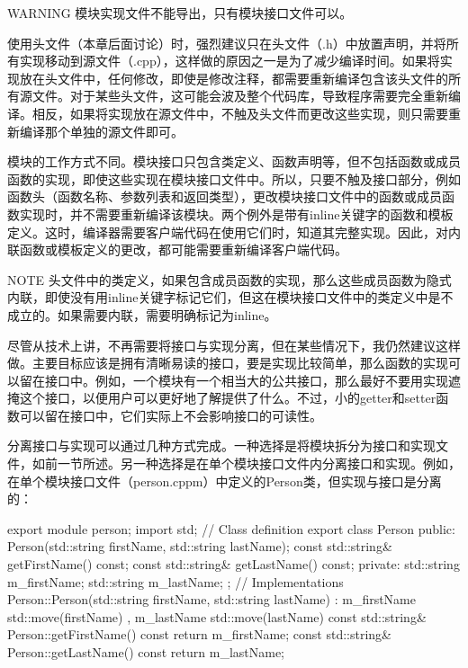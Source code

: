 \begin{myWarning}{WARNING}
模块实现文件不能导出，只有模块接口文件可以。
\end{myWarning}


使用头文件（本章后面讨论）时，强烈建议只在头文件（.h）中放置声明，并将所有实现移动到源文件（.cpp），这样做的原因之一是为了减少编译时间。如果将实现放在头文件中，任何修改，即使是修改注释，都需要重新编译包含该头文件的所有源文件。对于某些头文件，这可能会波及整个代码库，导致程序需要完全重新编译。相反，如果将实现放在源文件中，不触及头文件而更改这些实现，则只需要重新编译那个单独的源文件即可。

模块的工作方式不同。模块接口只包含类定义、函数声明等，但不包括函数或成员函数的实现，即使这些实现在模块接口文件中。所以，只要不触及接口部分，例如函数头（函数名称、参数列表和返回类型），更改模块接口文件中的函数或成员函数实现时，并不需要重新编译该模块。两个例外是带有inline关键字的函数和模板定义。这时，编译器需要客户端代码在使用它们时，知道其完整实现。因此，对内联函数或模板定义的更改，都可能需要重新编译客户端代码。

\begin{myNotic}{NOTE}
头文件中的类定义，如果包含成员函数的实现，那么这些成员函数为隐式内联，即使没有用inline关键字标记它们，但这在模块接口文件中的类定义中是不成立的。如果需要内联，需要明确标记为inline。
\end{myNotic}

尽管从技术上讲，不再需要将接口与实现分离，但在某些情况下，我仍然建议这样做。主要目标应该是拥有清晰易读的接口，要是实现比较简单，那么函数的实现可以留在接口中。例如，一个模块有一个相当大的公共接口，那么最好不要用实现遮掩这个接口，以便用户可以更好地了解提供了什么。不过，小的getter和setter函数可以留在接口中，它们实际上不会影响接口的可读性。

分离接口与实现可以通过几种方式完成。一种选择是将模块拆分为接口和实现文件，如前一节所述。另一种选择是在单个模块接口文件内分离接口和实现。例如，在单个模块接口文件（person.cppm）中定义的Person类，但实现与接口是分离的：

\begin{cpp}
export module person;
import std;
// Class definition
export class Person
{
    public:
        Person(std::string firstName, std::string lastName);
        const std::string& getFirstName() const;
        const std::string& getLastName() const;
    private:
        std::string m_firstName;
        std::string m_lastName;
};
// Implementations
Person::Person(std::string firstName, std::string lastName)
    : m_firstName { std::move(firstName) }, m_lastName { std::move(lastName) } { }
const std::string& Person::getFirstName() const { return m_firstName; }
const std::string& Person::getLastName() const { return m_lastName; }
\end{cpp}


